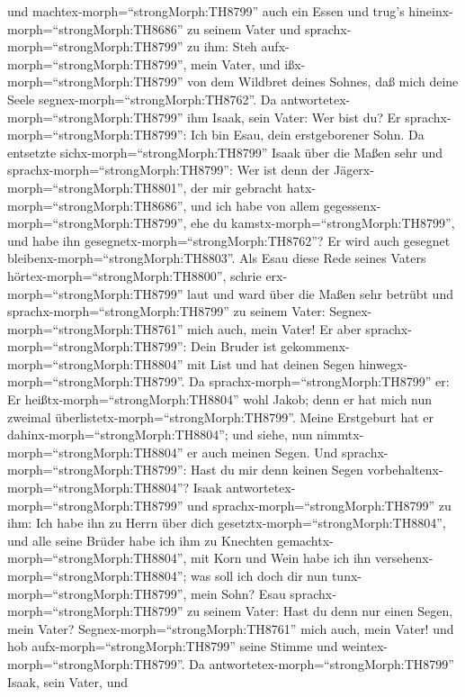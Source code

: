  und machtex-morph=``strongMorph:TH8799'' auch ein Essen
und trug's hineinx-morph=``strongMorph:TH8686'' zu seinem Vater und
sprachx-morph=``strongMorph:TH8799'' zu ihm: Steh
aufx-morph=``strongMorph:TH8799'', mein Vater, und
ißx-morph=``strongMorph:TH8799'' von dem Wildbret deines Sohnes, daß
mich deine Seele segnex-morph=``strongMorph:TH8762''.  Da
antwortetex-morph=``strongMorph:TH8799'' ihm Isaak, sein Vater: Wer bist
du? Er sprachx-morph=``strongMorph:TH8799'': Ich bin Esau, dein
erstgeborener Sohn.  Da entsetzte
sichx-morph=``strongMorph:TH8799'' Isaak über die Maßen sehr und
sprachx-morph=``strongMorph:TH8799'': Wer ist denn der
Jägerx-morph=``strongMorph:TH8801'', der mir gebracht
hatx-morph=``strongMorph:TH8686'', und ich habe von allem
gegessenx-morph=``strongMorph:TH8799'', ehe du
kamstx-morph=``strongMorph:TH8799'', und habe ihn
gesegnetx-morph=``strongMorph:TH8762''? Er wird auch gesegnet
bleibenx-morph=``strongMorph:TH8803''.  Als Esau diese Rede
seines Vaters hörtex-morph=``strongMorph:TH8800'', schrie
erx-morph=``strongMorph:TH8799'' laut und ward über die Maßen sehr
betrübt und sprachx-morph=``strongMorph:TH8799'' zu seinem Vater:
Segnex-morph=``strongMorph:TH8761'' mich auch, mein Vater! 
Er aber sprachx-morph=``strongMorph:TH8799'': Dein Bruder ist
gekommenx-morph=``strongMorph:TH8804'' mit List und hat deinen Segen
hinwegx-morph=``strongMorph:TH8799''.  Da
sprachx-morph=``strongMorph:TH8799'' er: Er
heißtx-morph=``strongMorph:TH8804'' wohl Jakob; denn er hat mich nun
zweimal überlistetx-morph=``strongMorph:TH8799''. Meine Erstgeburt hat
er dahinx-morph=``strongMorph:TH8804''; und siehe, nun
nimmtx-morph=``strongMorph:TH8804'' er auch meinen Segen. Und
sprachx-morph=``strongMorph:TH8799'': Hast du mir denn keinen Segen
vorbehaltenx-morph=``strongMorph:TH8804''?  Isaak
antwortetex-morph=``strongMorph:TH8799'' und
sprachx-morph=``strongMorph:TH8799'' zu ihm: Ich habe ihn zu Herrn über
dich gesetztx-morph=``strongMorph:TH8804'', und alle seine Brüder habe
ich ihm zu Knechten gemachtx-morph=``strongMorph:TH8804'', mit Korn und
Wein habe ich ihn versehenx-morph=``strongMorph:TH8804''; was soll ich
doch dir nun tunx-morph=``strongMorph:TH8799'', mein Sohn? 
Esau sprachx-morph=``strongMorph:TH8799'' zu seinem Vater: Hast du denn
nur einen Segen, mein Vater? Segnex-morph=``strongMorph:TH8761'' mich
auch, mein Vater! und hob aufx-morph=``strongMorph:TH8799'' seine Stimme
und weintex-morph=``strongMorph:TH8799''.  Da
antwortetex-morph=``strongMorph:TH8799'' Isaak, sein Vater, und

